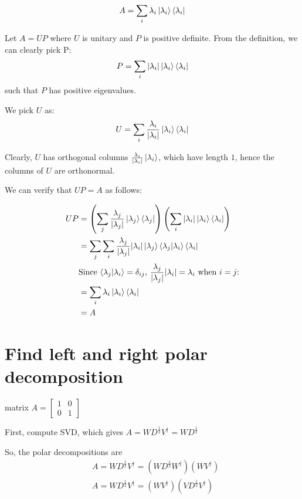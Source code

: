\documentclass[11pt]{book}
\begin{document}
\begin{align*}
    A = \sum_i \lambda_i \ket{\lambda_i} \bra{\lambda_i}
\end{align*}

Let $A = UP$ where $U$ is unitary and $P$ is positive definite. From the
definition, we can clearly pick P:
\begin{align*}
    P = \sum_i |\lambda_i| \ket{\lambda_i} \bra{\lambda_i}
\end{align*}
such that $P$ has positive eigenvalues.

We pick $U$ as:
\begin{align*}
    U = \sum_i \frac{\lambda_i}{|\lambda_i|} \ket{\lambda_i} \bra{\lambda_i}
\end{align*}

Clearly, $U$ has orthogonal columns $\frac{\lambda_i}{|\lambda_i|} \ket{\lambda_i}$,
which have length $1$, hence the columns of $U$ are orthonormal.

We can verify that $UP = A$ as follows:

\begin{align*}
    UP &= \left( \sum_j \frac{\lambda_j}{|\lambda_j|} \ket{\lambda_j} \bra{\lambda_j} \right)
        \left( \sum_i |\lambda_i| \ket{\lambda_i} \bra{\lambda_i} \right) \\
        &= \sum_j \sum_i \frac{\lambda_j}{|\lambda_j|} |\lambda_i| \ket{\lambda_j} \bra{\lambda_j}  \ket{\lambda_i} \bra{\lambda_i} \\
        &\text{Since $\bra{\lambda_j}\ket{\lambda_i} = \delta_{ij}$, $\frac{\lambda_j}{|\lambda_j|} |\lambda_i| = \lambda_i$ when $i=j$:} \\
        &= \sum_i \lambda_i  \ket{\lambda_i} \bra{\lambda_i} \\
        &= A
\end{align*}


\section{Find left and right polar decomposition}
matrix $A = \begin{bmatrix} 1 & 0 \\ 0 & 1\end{bmatrix}$


First, compute SVD, which gives $A = WD^\frac{1}{2}V^\dagger = WD^\frac{1}{2}$

So, the polar decompositions are
\begin{align*}
    &A = WD^\frac{1}{2}V^\dagger = (WD^\frac{1}{2}W^\dagger) (WV^\dagger) \\
    &A = WD^\frac{1}{2}V^\dagger = (WV^\dagger)(VD^\frac{1}{2}V^\dagger)
\end{align*}
\end{document}
